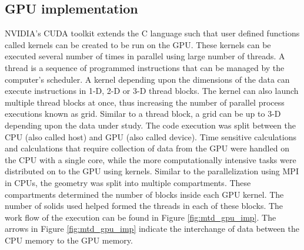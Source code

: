 \documentclass[preprint,10pt,authoryear,review]{elsarticle}
\begin{document}
\subsection{GPU implementation}
NVIDIA’s CUDA toolkit extends the C language such that user defined functions 
called kernels can be created to be run on the GPU. These kernels can be 
executed several number of times in parallel using large number of threads. 
A thread is a sequence of programmed instructions that can be managed by the 
computer’s scheduler. A kernel depending upon the dimensions of the data can execute 
instructions in 1-D, 2-D or 3-D thread blocks. The kernel can also launch 
multiple thread blocks at once, thus increasing the number of parallel 
process executions known as grid. Similar to a thread block, a grid can 
be up to 3-D depending upon the data under study.
The code execution was split between the CPU (also called host) and GPU 
(also called device). Time sensitive calculations and calculations that
require collection of data from the GPU were handled on the CPU 
with a single core, while the more 
computationally intensive tasks were distributed on to the GPU using 
kernels. Similar to the parallelization using MPI in CPUs, the geometry was 
split into multiple compartments. These compartments determined the number of 
blocks inside each GPU kernel. The number of solids used helped formed 
the threads in each of these blocks. The work flow of the execution can 
be found in Figure \ref{fig:mtd_gpu_imp}. The arrows in Figure \ref{fig:mtd_gpu_imp} 
indicate the interchange of data between the CPU memory to the GPU memory. 
\end{document}
